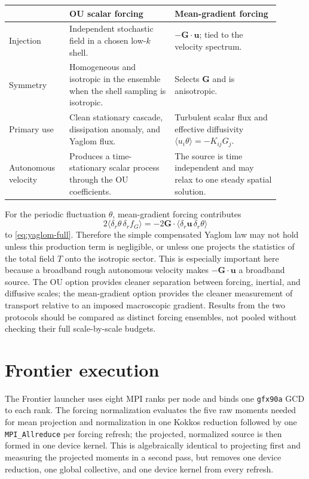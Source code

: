 \documentclass[10pt]{article}
\begin{document}
\begin{center}
\small
\begin{tabular}{p{0.20\linewidth}p{0.35\linewidth}p{0.35\linewidth}}
\toprule
 & OU scalar forcing & Mean-gradient forcing \\
\midrule
Injection &
Independent stochastic field in a chosen low-$k$ shell. &
$-\boldsymbol G\!\cdot\boldsymbol u$; tied to the velocity spectrum. \\
Symmetry &
Homogeneous and isotropic in the ensemble when the shell sampling is isotropic. &
Selects $\boldsymbol G$ and is anisotropic. \\
Primary use &
Clean stationary cascade, dissipation anomaly, and Yaglom flux. &
Turbulent scalar flux and effective diffusivity
$\langle u_i\theta\rangle=-K_{ij}G_j$. \\
Autonomous velocity &
Produces a time-stationary scalar process through the OU coefficients. &
The source is time independent and may relax to one steady spatial solution. \\
\bottomrule
\end{tabular}
\end{center}

For the periodic fluctuation $\theta$, mean-gradient forcing contributes
\begin{equation}
 2\langle\delta_r\theta\,\delta_r f_G\rangle
 =-2\boldsymbol G\!\cdot
   \langle\delta_r\boldsymbol u\,\delta_r\theta\rangle
\end{equation}
to \eqref{eq:yaglom-full}.  Therefore the simple compensated Yaglom law may
not hold unless this production term is negligible, or unless one projects
the statistics of the total field $T$ onto the isotropic sector.  This is
especially important here because a broadband rough autonomous velocity
makes $-\boldsymbol G\!\cdot\boldsymbol u$ a broadband source.  The OU option
provides cleaner separation between forcing, inertial, and diffusive scales;
the mean-gradient option provides the cleaner measurement of transport
relative to an imposed macroscopic gradient.  Results from the two protocols
should be compared as distinct forcing ensembles, not pooled without checking
their full scale-by-scale budgets.

\section{Frontier execution}

The Frontier launcher uses eight MPI ranks per node and binds one
\texttt{gfx90a} GCD to each rank.  The forcing normalization evaluates the
five raw moments needed for mean projection and normalization in one Kokkos
reduction followed by one \texttt{MPI\_Allreduce} per forcing refresh; the
projected, normalized source is then formed in one device kernel.  This is
algebraically identical to projecting first and measuring the projected
moments in a second pass, but removes one device reduction, one global
collective, and one device kernel from every refresh.
\end{document}
